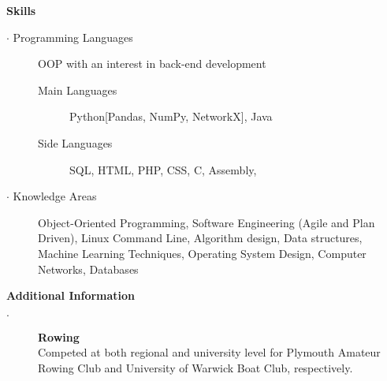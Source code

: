 \documentclass[12pt, a4paper]{article}
\begin{document}
\textbf{Skills}
  \begin{description}
    \item[$\cdot$ Programming Languages] OOP with an interest in back-end development
    \begin{description}
      \item[Main Languages] Python[Pandas, NumPy, NetworkX], Java
      \item[Side Languages] SQL, HTML, PHP, CSS, C, Assembly,
    \end{description}
    \item[$\cdot$ Knowledge Areas] Object-Oriented Programming, Software Engineering (Agile and Plan Driven), Linux Command Line, Algorithm design, Data structures, Machine Learning Techniques, Operating System Design, Computer Networks, Databases
  \end{description}
\bigskip

  \textbf{Additional Information}
    \begin{description}
      \item[$\cdot$] \textbf{Rowing} \\Competed at both regional and university level for Plymouth Amateur Rowing Club and University of Warwick Boat Club, respectively.

      \iffalse
      Rowing has taught me the value of team work, and has given me transferable skills including resilience, decision making, and precision, all of which I bring to the workplace.
      Time management $\cdot$ Team work $\cdot$ Resilience $\cdot$ Motivational skills $\cdot$ Quick thinking \\ $\cdot$ Technical planning $\cdot$ Precision
      \fi
    \end{description}
\end{document}
